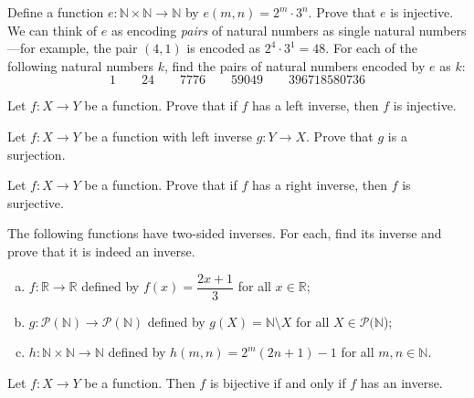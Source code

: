 \begin{exercise}
\label{exEncodingPairs}
Define a function $e : \mathbb{N} \times \mathbb{N} \to \mathbb{N}$ by $e(m,n) = 2^m \cdot 3^n$. Prove that $e$ is injective. We can think of $e$ as encoding \textit{pairs} of natural numbers as single natural numbers---for example, the pair $(4,1)$ is encoded as $2^4 \cdot 3^1 = 48$. For each of the following natural numbers $k$, find the pairs of natural numbers encoded by $e$ as $k$:
\[ 1 \qquad 24 \qquad 7776 \qquad 59049 \qquad 396718580736 \]
\end{exercise}


\begin{exercise}
\label{exIfHasLeftInverseThenInjective}
Let $f : X \to Y$ be a function. Prove that if $f$ has a left inverse, then $f$ is injective.
\end{exercise}


\begin{exercise}
Let $f : X \to Y$ be a function with left inverse $g : Y \to X$. Prove that $g$ is a surjection.
\end{exercise}


\begin{exercise}
Let $f : X \to Y$ be a function. Prove that if $f$ has a right inverse, then $f$ is surjective.
\end{exercise}


\begin{exercise}
\label{exFindTwoSidedInverses}
The following functions have two-sided inverses. For each, find its inverse and prove that it is indeed an inverse.
\begin{enumerate}[(a)]
\item $f : \mathbb{R} \to \mathbb{R}$ defined by $f(x)=\dfrac{2x+1}{3}$ for all $x \in \mathbb{R}$;
\item $g : \mathcal{P}(\mathbb{N}) \to \mathcal{P}(\mathbb{N})$ defined by $g(X) = \mathbb{N} \setminus X$ for all $X \in \mathcal{P}(\mathbb{N}$);
\item $h : \mathbb{N} \times \mathbb{N} \to \mathbb{N}$ defined by $h(m,n) = 2^m(2n+1)-1$ for all $m,n \in \mathbb{N}$.
\end{enumerate}
\end{exercise}


\begin{exercise}
\label{exBijectiveIffHasInverse}
Let $f : X \to Y$ be a function. Then $f$ is bijective if and only if $f$ has an inverse.
\end{exercise}

